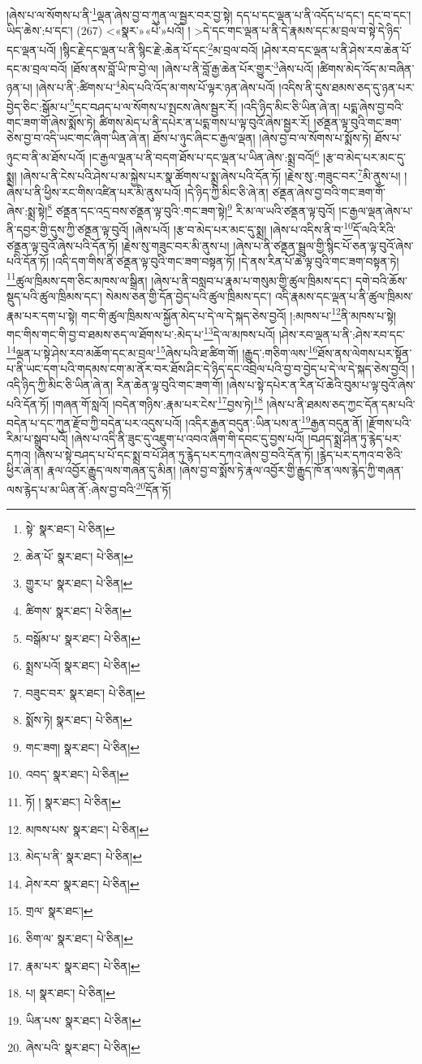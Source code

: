 །ཞེས་པ་ལ་སོགས་པ་ནི་\footnote{སྟེ་  སྣར་ཐང་།  པེ་ཅིན། }ལྡན་ཞེས་བྱ་བ་ཀུན་ལ་སྦྱར་བར་བྱ་སྟེ། དད་པ་དང་ལྡན་པ་ནི་འདོད་པ་དང་། དང་བ་དང་། ཡིད་ཆེས་:པ་དང་། (267) <«སྣར་»«པེ་»པའོ། །
 >དེ་དང་གང་ལྡན་པ་ནི་དེ་རྣམས་དང་མ་བྲལ་བ་སྟེ་དེ་ཉིད་དང་ལྡན་པའོ། །སྙིང་རྗེ་དང་ལྡན་པ་ནི་སྙིང་རྗེ་:ཆེན་པོ་དང་\footnote{ཆེན་པོ་  སྣར་ཐང་།  པེ་ཅིན། }མ་བྲལ་བའོ། །ཤེས་རབ་དང་ལྡན་པ་ནི་ཤེས་རབ་ཆེན་པོ་དང་མ་བྲལ་བའོ། །ཐོས་ནས་བློ་ཡི་ཁ་བྱེ་ལ། །ཞེས་པ་ནི་བློ་རྒྱ་ཆེན་པོར་གྱུར་\footnote{གྱུར་པ་  སྣར་ཐང་།  པེ་ཅིན། }ཞེས་པའོ། །ཚིགས་མེད་འོད་མ་བཞིན་ཉན་པ། །ཞེས་པ་ནི་:ཚིགས་པ་\footnote{ཚིགས་  སྣར་ཐང་།  པེ་ཅིན། }མེད་པའི་འོད་མ་གས་པོ་ལྟར་ཉན་ཞེས་པའོ། །འདིས་ནི་དུས་ཐམས་ཅད་དུ་ཉན་པར་བྱེད་ཅིང་:སྒོམ་པ་\footnote{བསྒོམ་པ་  སྣར་ཐང་།  པེ་ཅིན། }དང་བཤད་པ་ལ་སོགས་པ་སྤངས་ཞེས་སྦྱར་རོ། །འདི་ཉིད་མིང་ཅི་ཡིན་ཞེ་ན། པདྨ་ཞེས་བྱ་བའི་གང་ཟག་གོ་ཞེས་སྨོས་ཏེ། ཚིགས་མེད་པ་ནི་དཔེར་ན་པདྨ་གས་པ་ལྟ་བུའོ་ཞེས་སྦྱར་རོ། །ཙནྡན་ལྟ་བུའི་གང་ཟག་ཅེས་བྱ་བ་འདི་ཡང་གང་ཞིག་ཡིན་ཞེ་ན། ཐོས་པ་ཉུང་ཞིང་ང་རྒྱལ་ལྡན། །ཞེས་བྱ་བ་ལ་སོགས་པ་སྨོས་ཏེ། ཐོས་པ་ཉུང་བ་ནི་མ་ཐོས་པའོ། །ང་རྒྱལ་ལྡན་པ་ནི་བདག་ཐོས་པ་དང་ལྡན་པ་ཡིན་ཞེས་:སྨྲ་བའོ།\footnote{སྨྲས་པའོ།  སྣར་ཐང་།  པེ་ཅིན། } །རྩ་བ་མེད་པར་མང་དུ་སྨྲ། །ཞེས་པ་ནི་ངེས་པའི་ཤེས་པ་མ་སྐྱེས་པར་སྣ་ཚོགས་པ་སྨྲ་ཞེས་པའི་དོན་ཏོ། །རྗེས་སུ་:གཟུང་བར་\footnote{བཟུང་བར་  སྣར་ཐང་།  པེ་ཅིན། }མི་ནུས་པ། །ཞེས་པ་ནི་ཕྱིས་རང་གིས་འཛིན་པར་མི་ནུས་པའོ། །དེ་ཉིད་ཀྱི་མིང་ཅི་ཞེ་ན། ཙནྡན་ཞེས་བྱ་བའི་གང་ཟག་གོ་ཞེས་:སྨྲ་སྟེ།\footnote{སྨོས་ཏེ།  སྣར་ཐང་།  པེ་ཅིན། } ཙནྡན་དང་འདྲ་བས་ཙནྡན་ལྟ་བུའི་:གང་ཟག་སྟེ།\footnote{གང་ཟག།  སྣར་ཐང་།  པེ་ཅིན། } རི་མ་ལ་ཡའི་ཙནྡན་ལྟ་བུའོ། །ང་རྒྱལ་ལྡན་ཞེས་པ་ནི་དབྱར་གྱི་དུས་ཀྱི་ཙནྡན་ལྟ་བུའོ། །ཞེས་པའོ། །རྩ་བ་མེད་པར་མང་དུ་སྨྲ། །ཞེས་པ་འདིས་ནི་བ་\footnote{འབད་  སྣར་ཐང་།  པེ་ཅིན། }དོ་ལའི་རིའི་ཙནྡན་ལྟ་བུའོ་ཞེས་པའི་དོན་ཏོ། །རྗེས་སུ་གཟུང་བར་མི་ནུས་པ། །ཞེས་པ་ནི་ཙནྡན་སྦྲུལ་གྱི་སྙིང་པོ་ཅན་ལྟ་བུའོ་ཞེས་པའི་དོན་ཏོ། །འདི་དག་གིས་ནི་ཙནྡན་ལྟ་བུའི་གང་ཟག་བསྟན་ཏོ། །དེ་ནས་རིན་པོ་ཆེ་ལྟ་བུའི་གང་ཟག་བསྟན་ཏེ། \footnote{ཏོ། །   སྣར་ཐང་།  པེ་ཅིན། }ཚུལ་ཁྲིམས་དག་ཅིང་མཁས་ལ་སྒྲིན། །ཞེས་པ་ནི་བསླབ་པ་རྣམ་པ་གསུམ་གྱི་ཚུལ་ཁྲིམས་དང་། དགེ་བའི་ཆོས་སྡུད་པའི་ཚུལ་ཁྲིམས་དང་། སེམས་ཅན་གྱི་དོན་བྱེད་པའི་ཚུལ་ཁྲིམས་དང་། འདི་རྣམས་དང་ལྡན་པ་ནི་ཚུལ་ཁྲིམས་རྣམ་པར་དག་པ་སྟེ། གང་གི་ཚུལ་ཁྲིམས་ལ་སྐྱོན་མེད་པ་དེ་ལ་དེ་སྐད་ཅེས་བྱའོ། །:མཁས་པ་\footnote{མཁས་པས་  སྣར་ཐང་།  པེ་ཅིན། }ནི་མཁས་པ་སྟེ། གང་གིས་གང་གི་བྱ་བ་ཐམས་ཅད་ལ་ཐོགས་པ་:མེད་པ་\footnote{མེད་པ་ནི་  སྣར་ཐང་།  པེ་ཅིན། }དེ་ལ་མཁས་པའོ། །ཤེས་རབ་ལྡན་པ་ནི་:ཤེས་རབ་དང་\footnote{ཤེས་རབ་  སྣར་ཐང་།  པེ་ཅིན། }ལྡན་པ་སྟེ་ཤེས་རབ་མཆོག་དང་མ་བྲལ་\footnote{གྲལ་  སྣར་ཐང་། }ཞེས་པའི་ཐ་ཚིག་གོ། །རྒྱུད་:གཅིག་ལས་\footnote{ཅིག་ལ་  སྣར་ཐང་།  པེ་ཅིན། }ཐོས་ནས་ལེགས་པར་སྟོན་པ་ནི་ཡང་དག་པའི་གདམས་ངག་མ་ནོར་བར་ཐོས་ཤིང་དེ་ཉིད་དང་འབྲེལ་པའི་བྱ་བ་བྱེད་པ་དེ་ལ་དེ་སྐད་ཅེས་བྱའོ། །འདི་ཉིད་ཀྱི་མིང་ཅི་ཡིན་ཞེ་ན། རིན་ཆེན་ལྟ་བུའི་གང་ཟག་གོ། །ཞེས་པ་སྟེ་དཔེར་ན་རིན་པོ་ཆེའི་བུམ་པ་ལྟ་བུའོ་ཞེས་པའི་དོན་ཏོ། །གཞན་གོ་སླའོ། །བདེན་གཉིས་:རྣམ་པར་ངེས་\footnote{རྣམ་པར་  སྣར་ཐང་།  པེ་ཅིན། }བྱས་ཏེ།\footnote{པ།  སྣར་ཐང་།  པེ་ཅིན། } །ཞེས་པ་ནི་ཐམས་ཅད་ཀྱང་དོན་དམ་པའི་བདེན་པ་དང་ཀུན་རྫོབ་ཀྱི་བདེན་པར་འདུས་པའོ། །འདིར་རྒྱན་བདུན་:ཡིན་པས་ན་\footnote{ཡིན་པས་  སྣར་ཐང་།  པེ་ཅིན། }རྒྱན་བདུན་ནོ། །རྫོགས་པའི་རིམ་པ་སྒྲུབ་པའོ། །ཞེས་པ་འདི་ནི་ཟུང་དུ་འཇུག་པ་འབའ་ཞིག་གི་དབང་དུ་བྱས་པའོ། །བཤད་སྨྲ་ཤིན་ཏུ་རྙེད་པར་དཀའ། །ཞེས་པ་སྟེ་བཤད་པ་པོ་དང་སྨྲ་བ་པོ་ཤིན་ཏུ་རྙེད་པར་དཀའ་ཞེས་བྱ་བའི་དོན་ཏོ། །རྙེད་པར་དཀའ་བ་ཅིའི་ཕྱིར་ཞེ་ན། རྣལ་འབྱོར་རྒྱུད་ལས་གཞན་དུ་མིན། །ཞེས་བྱ་བ་སྨོས་ཏེ་རྣལ་འབྱོར་གྱི་རྒྱུད་ཁོ་ན་ལས་རྙེད་ཀྱི་གཞན་ལས་རྙེད་པ་མ་ཡིན་ནོ་:ཞེས་བྱ་བའི་\footnote{ཞེས་པའི་  སྣར་ཐང་།  པེ་ཅིན། }དོན་ཏོ། 